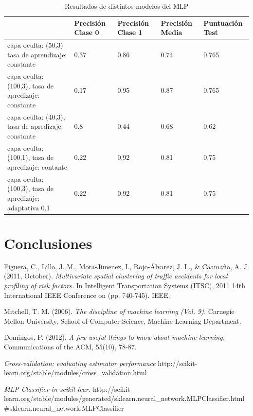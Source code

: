 \documentclass[journal,twoside]{JoPhA}
\begin{document}
\begin{table}[htb!]
\begin{center}
	\caption{Resultados de distintos modelos del MLP}
	\begin{tabular}{| p{2.1cm} | p{1cm} | p{1cm} | p{1cm} | p{1.2cm} |}
		\hline
		         & Precisión Clase 0 & Precisión Clase 1 & Precisión Media & Puntuación Test   \\ \hline
		capa oculta: (50,3) tasa de aprendizaje: constante & 0.37                & 0.86                & 0.74              & 0.765  \\ \hline
		capa oculta: (100,3), tasa de apredizaje: constante & 0.17                & 0.95               & 0.87             & 0.765  \\ \hline
		capa oculta: (40,3), tasa de apredizaje: constante & 0.8 & 0.44 & 0.68 & 0.62 \\ \hline
		capa oculta: (100,1), tasa de apredizaje: contante & 0.22 & 0.92 & 0.81 & 0.75	\\ \hline
		capa oculta: (100,3), tasa de apredizaje: adaptativa 0.1 & 0.22 & 0.92 & 0.81 & 0.75 \\ \hline
 		
	\end{tabular}
	
	\label{tabla:tabla_mlp}
\end{center}
\end{table}

\section{Conclusiones}

\begin{thebibliography}{1}

Figuera, C., Lillo, J. M., Mora-Jimenez, I., Rojo-Álvarez, J. L., \& Caamaño, A. J. (2011, October). \emph{Multivariate spatial clustering of traffic accidents for local profiling of risk factors.} In Intelligent Transportation Systems (ITSC), 2011 14th International IEEE Conference on (pp. 740-745). IEEE.

Mitchell, T. M. (2006). \emph{The discipline of machine learning (Vol. 9).} Carnegie Mellon University, School of Computer Science, Machine Learning Department.

Domingos, P. (2012). \emph{A few useful things to know about machine learning.} Communications of the ACM, 55(10), 78-87.

\emph{Cross-validation: evaluating estimator performance} http://scikit-learn.org/stable/modules/cross\_validation.html

\emph{MLP Classifier in scikit-lear.}
http://scikit-learn.org/stable/modules/generated/sklearn.neural\_network.MLPClassifier.html\#sklearn.neural\_network.MLPClassifier

\end{thebibliography}
\end{document}
